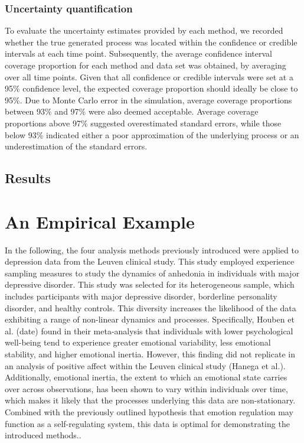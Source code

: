 \documentclass[man, floatsintext]{apa7}
\begin{document}
\subsubsection{Uncertainty quantification}

To evaluate the uncertainty estimates provided by each method, we recorded
whether the true generated process was located within the confidence or
credible intervals at each time point.
Subsequently, the average
confidence interval coverage proportion for each method and data set was
obtained, by averaging over all time points.
Given that all confidence or credible intervals were set at a
95\% confidence level, the expected coverage proportion should ideally be
close to 95\%. Due to Monte Carlo error in the simulation, average coverage
proportions between 93\% and 97\% were also deemed acceptable.
Average coverage proportions above 97\% suggested overestimated standard
errors,
while those below 93\% indicated either a poor approximation of the underlying
process or an underestimation of the standard errors.

\subsection{Results}

\section{An Empirical Example}

In the following, the four analysis methods previously introduced were
applied to depression data from the Leuven clinical study. This study employed
experience sampling measures to study the dynamics of anhedonia in
individuals with major depressive disorder. This study was selected for its
heterogeneous sample, which includes participants with major depressive
disorder, borderline personality disorder, and healthy controls. This diversity
increases the likelihood of the data exhibiting a range of non-linear dynamics
and processes. Specifically, Houben et al. (date) found in their meta-analysis
that individuals with lower psychological well-being tend to experience greater
emotional variability, less emotional stability, and higher emotional inertia.
However, this finding did not replicate in an analysis of positive affect
within the Leuven clinical study (Hanega et al.). Additionally, emotional
inertia, the extent to which an emotional state carries over across
observations, has been shown to vary within individuals over time, which makes
it likely that the processes underlying this data are non-stationary.
Combined with the previously outlined hypothesis
that emotion regulation may function as a self-regulating system, this data
is optimal for demonstrating the introduced methods..
\end{document}
